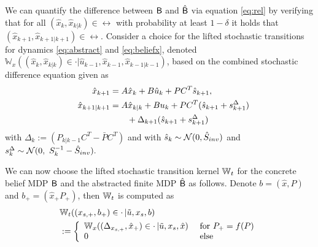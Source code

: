 \documentclass{ifacconf}
\begin{document}
We can quantify the difference between $\mathsf{B}$ and $\hat{\mathsf{B}}$ via equation \eqref{eq:rel} by verifying that for all  $(\hat x_k,\hat x_{k|k})\in \rel$ with probability at least $1-\delta$ it holds that $(\hat x_{k+1},\hat x_{k+1|k+1})\in \rel$. 
Consider a choice for the lifted stochastic  transitions  for  dynamics \eqref{eq:abstract} and \eqref{eq:beliefx},  denoted 
	$ \mathbb W_{x}((\hat x_k, \hat x_{k|k})\in \cdot| \hat u_{k-1}, \hat x_{k-1}, \hat x_{k-1|k-1})$, based on the combined stochastic difference equation given as
\begin{align*}
		&&\hat x_{k+1} &=A\hat x_{k} +B\hat u_{k} + \bar P  C^T  \hat{s}_{k+1},\\%
	&&\hat x_{k+1|k+1}&=A\hat x_{k|k}+Bu_{k}+  \bar P   C^T(  \hat{s}_{k+1}+s^\Delta_{k+1})\notag\\&&&\qquad+\Delta_{k+1}( \hat{s}_{k+1}+ s^\Delta_{k+1})%
\end{align*}
 with $\Delta_k:=(P_{k|k-1}C^T-  \bar P   C^T)$ and with $ \hat{s}_k\sim \mathcal{N} (0,\hat{S}_{inv})$ and $ s^\Delta_k\sim  \mathcal{N} (0,\  S_k^{-1}-\hat{S}_{inv}). $


We can now choose the lifted stochastic transition kernel 	$\mathbb{W}_{t}$ for the concrete belief MDP $\mathsf{B}$ and the abstracted finite MDP $\hat{\mathsf{B}}$ as follows.
Denote $b=(\hat x, P)$ and $b_+=(\hat x_+ P_+)$, then $\mathbb{W}_{t}$ is computed as 
 \begin{align*}
 &	\mathbb{W}_{t}((x_{s,+},b_+)\in \cdot\,| \tilde u, x_s ,b)\\&:= \left\{\begin{array}{ll} \mathbb W_{x}((\Delta_{x_{s,+}}, \hat x_{+})\in \cdot\,|  \tilde u,x_s , \hat x) &\text{ for }  P_+=f(P)\\
 	0 & \text{ else } \end{array}\right.
 \end{align*}
\end{document}
